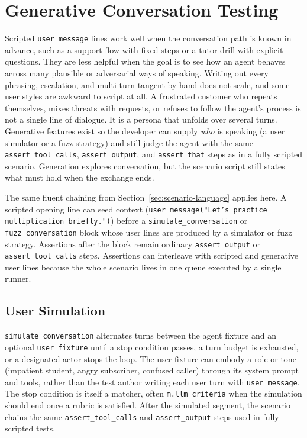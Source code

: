 \section{Generative Conversation Testing}
\label{sec:generative}

Scripted \texttt{user\_message} lines work well when the conversation path is known in advance, such as a support flow with fixed steps or a tutor drill with explicit questions. They are less helpful when the goal is to see how an agent behaves across many plausible or adversarial ways of speaking. Writing out every phrasing, escalation, and multi-turn tangent by hand does not scale, and some user styles are awkward to script at all. A frustrated customer who repeats themselves, mixes threats with requests, or refuses to follow the agent's process is not a single line of dialogue. It is a persona that unfolds over several turns. Generative features exist so the developer can supply \emph{who} is speaking (a user simulator or a fuzz strategy) and still judge the agent with the same \texttt{assert\_tool\_calls}, \texttt{assert\_output}, and \texttt{assert\_that} steps as in a fully scripted scenario. Generation explores conversation, but the scenario script still states what must hold when the exchange ends.

The same fluent chaining from Section~\ref{sec:scenario-language} applies here. A scripted opening line can seed context (\texttt{user\_message("Let's practice multiplication briefly.")}) before a \texttt{simulate\_conversation} or \texttt{fuzz\_conversation} block whose user lines are produced by a simulator or fuzz strategy. Assertions after the block remain ordinary \texttt{assert\_output} or \texttt{assert\_tool\_calls} steps. Assertions can interleave with scripted and generative user lines because the whole scenario lives in one queue executed by a single runner.

\subsection{User Simulation}

\texttt{simulate\_conversation} alternates turns between the agent fixture and an optional \texttt{user\_fixture} until a stop condition passes, a turn budget is exhausted, or a designated actor stops the loop. The user fixture can embody a role or tone (impatient student, angry subscriber, confused caller) through its system prompt and tools, rather than the test author writing each user turn with \texttt{user\_message}. The stop condition is itself a matcher, often \texttt{m.llm\_criteria} when the simulation should end once a rubric is satisfied. After the simulated segment, the scenario chains the same \texttt{assert\_tool\_calls} and \texttt{assert\_output} steps used in fully scripted tests.


